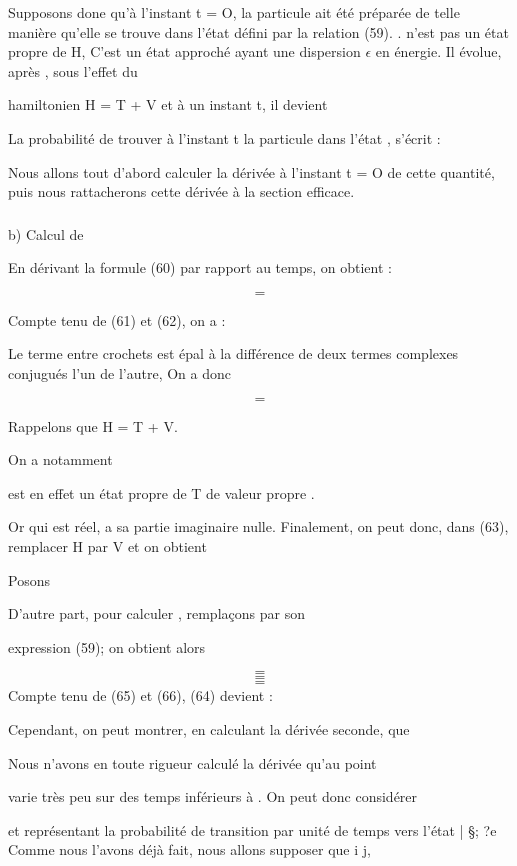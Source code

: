 Supposons done qu'à l'instant t = O, la particule ait été préparée
de telle manière qu'elle se trouve dans l'état  défini par la relation (59). .
n'est pas un état propre de H, C'est un état approché
ayant une dispersion $\epsilon$ en énergie. Il évolue, après , sous l'effet du

hamiltonien H = T + V et à un instant t, il devient

La probabilité de trouver à l'instant t la particule dans l'état ,
 s'écrit :


Nous allons tout d'abord calculer la dérivée à l'instant t = O de cette
quantité, puis nous rattacherons cette dérivée à la section efficace.

 

\subsubsection{}%
b) Calcul de 

En dérivant la formule (60) par rapport au temps, on obtient :

\[
\tag{62}=
\]

Compte tenu de (61) et (62), on a :

Le terme entre crochets est épal à la différence de deux termes complexes
conjugués l'un de l'autre, On a donc

\[
\tag{63}=
\]

Rappelons que H = T + V.

On a notamment

 est en effet un état propre de T de valeur propre .

Or  qui est réel, a sa partie imaginaire nulle.
Finalement, on peut donc, dans (63), remplacer H par V et on obtient

Posons

D'autre part, pour calculer , remplaçons  par son

expression (59); on obtient alors


\[
\tag{66}=
\]
\[
\tag{67}=
\]
\[
\tag{68}=
\]
Compte tenu de (65) et (66), (64) devient :

 Cependant, on peut montrer, en calculant la dérivée seconde, que

Nous n'avons en toute rigueur calculé la dérivée  qu'au point

 varie très peu sur des temps inférieurs à . On peut donc considérer


et représentant la probabilité de transition par unité de temps vers
l'état | \S; ?e
Comme nous l'avons déjà fait, nous allons supposer que i  j,

